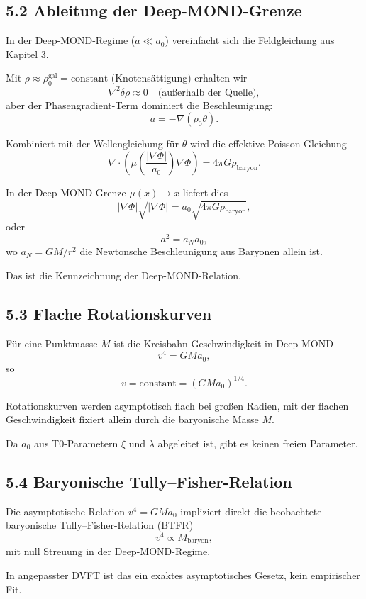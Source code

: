 	\subsection{5.2 Ableitung der Deep-MOND-Grenze}
	
	In der Deep-MOND-Regime ($a \ll a_0$) vereinfacht sich die Feldgleichung aus Kapitel 3.
	
	Mit $\rho \approx \rho_0^{\text{gal}} = \text{constant}$ (Knotensättigung) erhalten wir
	\[
	\nabla^2 \delta \rho \approx 0 \quad \text{(außerhalb der Quelle)},
	\]
	aber der Phasengradient-Term dominiert die Beschleunigung:
	\[
	a = -\nabla (\rho_0 \theta).
	\]
	
	Kombiniert mit der Wellengleichung für $\theta$ wird die effektive Poisson-Gleichung
	\[
	\nabla \cdot \left( \mu\left(\frac{|\nabla \Phi|}{a_0}\right) \nabla \Phi \right) = 4\pi G \rho_{\text{baryon}}.
	\]
	
	In der Deep-MOND-Grenze $\mu(x) \to x$ liefert dies
	\[
	|\nabla \Phi| \sqrt{|\nabla \Phi|} = a_0 \sqrt{4\pi G \rho_{\text{baryon}}},
	\]
	oder
	\[
	a^2 = a_N a_0,
	\]
	wo $a_N = GM/r^2$ die Newtonsche Beschleunigung aus Baryonen allein ist.
	
	Das ist die Kennzeichnung der Deep-MOND-Relation.
	
	\subsection{5.3 Flache Rotationskurven}
	
	Für eine Punktmasse $M$ ist die Kreisbahn-Geschwindigkeit in Deep-MOND
	\[
	v^4 = G M a_0,
	\]
	so
	\[
	v = \text{constant} = (G M a_0)^{1/4}.
	\]
	
	Rotationskurven werden asymptotisch flach bei großen Radien, mit der flachen Geschwindigkeit fixiert allein durch die baryonische Masse $M$.
	
	Da $a_0$ aus T0-Parametern $\xi$ und $\lambda$ abgeleitet ist, gibt es keinen freien Parameter.
	
	\subsection{5.4 Baryonische Tully–Fisher-Relation}
	
	Die asymptotische Relation $v^4 = G M a_0$ impliziert direkt die beobachtete baryonische Tully–Fisher-Relation (BTFR)
	\[
	v^4 \propto M_{\text{baryon}},
	\]
	mit null Streuung in der Deep-MOND-Regime.
	
	In angepasster DVFT ist das ein exaktes asymptotisches Gesetz, kein empirischer Fit.
	
